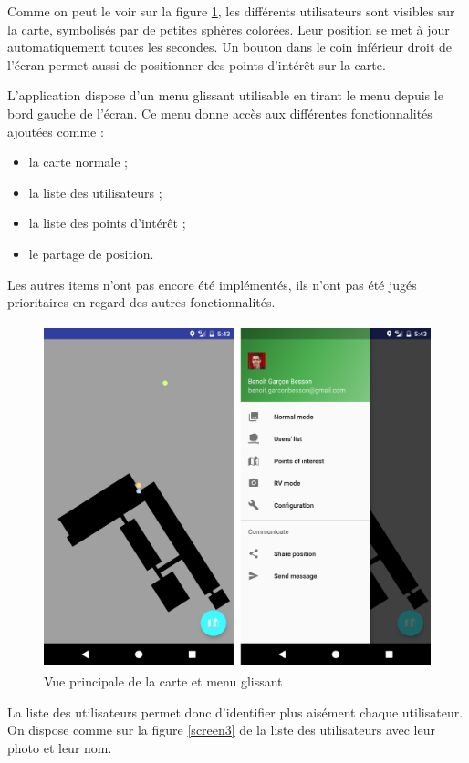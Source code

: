 Comme on peut le voir sur la figure \ref{screen2}, les différents utilisateurs sont visibles sur la carte, symbolisés par de petites sphères colorées. Leur position se met à jour automatiquement toutes les secondes. Un bouton dans le coin inférieur droit de l’écran permet aussi de positionner des points d’intérêt sur la carte.

L’application dispose d’un menu glissant utilisable en tirant le menu depuis le bord gauche de l’écran. Ce menu donne accès aux différentes fonctionnalités ajoutées comme :

\begin{itemize}
    \item la carte normale ;
    \item la liste des utilisateurs ;
    \item la liste des points d’intérêt ;
    \item le partage de position.
\end{itemize}

Les autres items n’ont pas encore été implémentés, ils n’ont pas été jugés prioritaires en regard des autres fonctionnalités.

\begin{figure}[H]
    \centering
    \includegraphics[height=10cm]{./img/screen2.png}
    \caption{Vue principale de la carte et menu glissant}
    \label{screen2}
\end{figure}

La liste des utilisateurs permet donc d’identifier plus aisément chaque utilisateur. On dispose comme sur la figure \ref{screen3} de la liste des utilisateurs avec leur photo et leur nom. 

